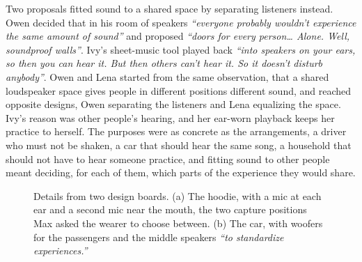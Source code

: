 Two proposals fitted sound to a shared space by separating listeners instead. Owen decided that in his room of speakers \textit{``everyone probably wouldn't experience the same amount of sound''} and proposed \textit{``doors for every person\ldots{} Alone. Well, soundproof walls''}. Ivy's sheet-music tool played back \textit{``into speakers on your ears, so then you can hear it. But then others can't hear it. So it doesn't disturb anybody''}. Owen and Lena started from the same observation, that a shared loudspeaker space gives people in different positions different sound, and reached opposite designs, Owen separating the listeners and Lena equalizing the space. Ivy's reason was other people's hearing, and her ear-worn playback keeps her practice to herself. The purposes were as concrete as the arrangements, a driver who must not be shaken, a car that should hear the same song, a household that should not have to hear someone practice, and fitting sound to other people meant deciding, for each of them, which parts of the experience they would share.

\begin{figure}[t]
  \centering
  \hfill
  \caption{Details from two design boards. (a) The hoodie, with a mic at each ear and a second mic near the mouth, the two capture positions Max asked the wearer to choose between. (b) The car, with woofers for the passengers and the middle speakers \textit{``to standardize experiences.''}}
  \label{fig:details}
\end{figure}

